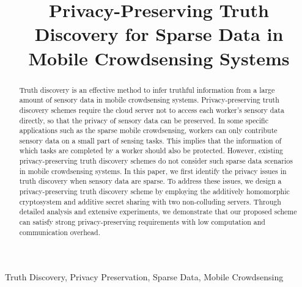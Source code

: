 \documentclass[conference]{IEEEtran}
\begin{document}
\title{Privacy-Preserving Truth Discovery for Sparse Data in Mobile Crowdsensing Systems\\
}


\author{
}

\maketitle

\begin{abstract}
Truth discovery is an effective method to infer truthful information from a large amount of sensory data in mobile crowdsensing systems.
Privacy-preserving truth discovery schemes require the cloud server not to access each worker's sensory data directly, so that the privacy of sensory data can be preserved.
In some specific applications such as the sparse mobile crowdsensing, workers can only contribute sensory data on a small part of sensing tasks. This implies that the information of which tasks are completed by a worker should also be protected.
However, existing privacy-preserving truth discovery schemes do not consider such sparse data scenarios in mobile crowdsensing systems.
In this paper, we first identify the privacy issues in truth discovery when sensory data are sparse.
To address these issues, we design a privacy-preserving truth discovery scheme by employing the additively homomorphic cryptosystem and additive secret sharing with two non-colluding servers.
Through detailed analysis and extensive experiments, we demonstrate that our proposed scheme can satisfy strong privacy-preserving requirements with low computation and communication overhead.
\end{abstract}
\begin{IEEEkeywords}
Truth Discovery, Privacy Preservation, Sparse Data, Mobile Crowdsensing
\end{IEEEkeywords}
\end{document}
